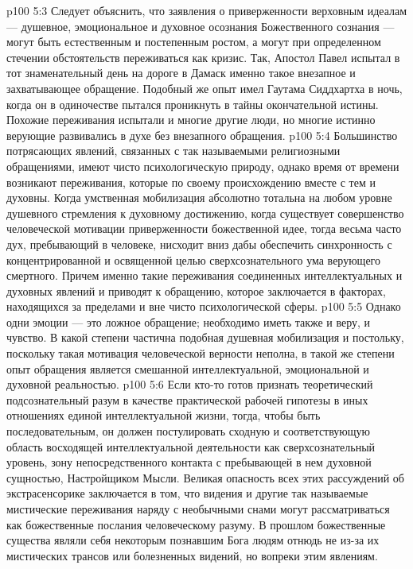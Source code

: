 \vs p100 5:3 \pc Следует объяснить, что заявления о приверженности верховным идеалам --- душевное, эмоциональное и духовное осознания Божественного сознания --- могут быть естественным и постепенным ростом, а могут при определенном стечении обстоятельств переживаться как кризис. Так, Апостол Павел испытал в тот знаменательный день на дороге в Дамаск именно такое внезапное и захватывающее обращение. Подобный же опыт имел Гаутама Сиддхартха в ночь, когда он в одиночестве пытался проникнуть в тайны окончательной истины. Похожие переживания испытали и многие другие люди, но многие истинно верующие развивались в духе без внезапного обращения.
\vs p100 5:4 Большинство потрясающих явлений, связанных с так называемыми религиозными обращениями, имеют чисто психологическую природу, однако время от времени возникают переживания, которые по своему происхождению вместе с тем и духовны. Когда умственная мобилизация абсолютно тотальна на любом уровне душевного стремления к духовному достижению, когда существует совершенство человеческой мотивации приверженности божественной идее, тогда весьма часто дух, пребывающий в человеке, нисходит вниз дабы обеспечить синхронность с концентрированной и освященной целью сверхсознательного ума верующего смертного. Причем именно такие переживания соединенных интеллектуальных и духовных явлений и приводят к обращению, которое заключается в факторах, находящихся за пределами и вне чисто психологической сферы.
\vs p100 5:5 Однако одни эмоции --- это ложное обращение; необходимо иметь также и веру, и чувство. В какой степени частична подобная душевная мобилизация и постольку, поскольку такая мотивация человеческой верности неполна, в такой же степени опыт обращения является смешанной интеллектуальной, эмоциональной и духовной реальностью.
\vs p100 5:6 \pc Если кто\hyp{}то готов признать теоретический подсознательный разум в качестве практической рабочей гипотезы в иных отношениях единой интеллектуальной жизни, тогда, чтобы быть последовательным, он должен постулировать сходную и соответствующую область восходящей интеллектуальной деятельности как сверхсознательный уровень, зону непосредственного контакта с пребывающей в нем духовной сущностью, Настройщиком Мысли. Великая опасность всех этих рассуждений об экстрасенсорике заключается в том, что видения и другие так называемые мистические переживания наряду с необычными снами могут рассматриваться как божественные послания человеческому разуму. В прошлом божественные существа являли себя некоторым познавшим Бога людям отнюдь не из\hyp{}за их мистических трансов или болезненных видений, но вопреки этим явлениям.
